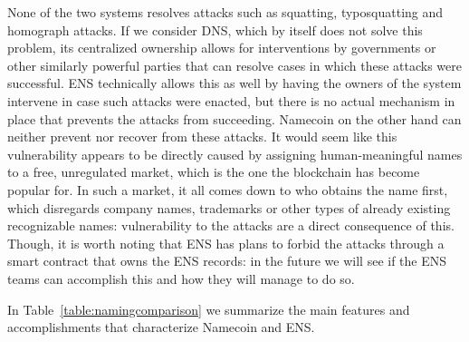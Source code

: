 \documentclass[mscthesis]{usiinfthesis}
\begin{document}
None of the two systems resolves attacks such as squatting, typosquatting and homograph attacks. If we consider DNS, which by itself does not solve this problem, its centralized ownership allows for interventions by governments or other similarly powerful parties that can resolve cases in which these attacks were successful. ENS technically allows this as well by having the owners of the system intervene in case such attacks were enacted, but there is no actual mechanism in place that prevents the attacks from succeeding. Namecoin on the other hand can neither prevent nor recover from these attacks. It would seem like this vulnerability appears to be directly caused by assigning human-meaningful names to a free, unregulated market, which is the one the blockchain has become popular for. In such a market, it all comes down to who obtains the name first, which disregards company names, trademarks or other types of already existing recognizable names: vulnerability to the attacks are a direct consequence of this. Though, it is worth noting that ENS has plans to forbid the attacks through a smart contract that owns the ENS records: in the future we will see if the ENS teams can accomplish this and how they will manage to do so.

In Table~\ref{table:namingcomparison} we summarize the main features and accomplishments that characterize Namecoin and ENS.
\end{document}
